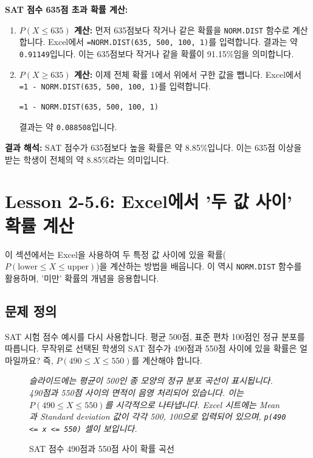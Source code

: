 \documentclass[11pt,a4paper]{article}
\begin{document}
\begin{examplebox}
    \textbf{SAT 점수 635점 초과 확률 계산:}
    \begin{enumerate}
        \item \textbf{$P(X \le 635)$ 계산:}
        먼저 635점보다 작거나 같은 확률을 \texttt{NORM.DIST} 함수로 계산합니다.
        Excel에서 \texttt{=NORM.DIST(635, 500, 100, 1)}를 입력합니다.
        결과는 약 \texttt{0.91149}입니다.
        이는 635점보다 작거나 같을 확률이 91.15\%임을 의미합니다.

        \item \textbf{$P(X \ge 635)$ 계산:}
        이제 전체 확률 1에서 위에서 구한 값을 뺍니다.
        Excel에서 \texttt{=1 - NORM.DIST(635, 500, 100, 1)}를 입력합니다.
        \begin{lstlisting}[language=Excel, caption={Excel에서 '초과' 확률 계산 예시}, label={lst:norm_dist_greater_than}]
=1 - NORM.DIST(635, 500, 100, 1)
        \end{lstlisting}
        결과는 약 \texttt{0.088508}입니다.
    \end{enumerate}

    \textbf{결과 해석:}
    SAT 점수가 635점보다 높을 확률은 약 8.85\%입니다.
    이는 635점 이상을 받는 학생이 전체의 약 8.85\%라는 의미입니다.
\end{examplebox}

\newpage
\section{Lesson 2-5.6: Excel에서 '두 값 사이' 확률 계산}

이 섹션에서는 Excel을 사용하여 두 특정 값 사이에 있을 확률($P(\text{lower} \le X \le \text{upper})$)을 계산하는 방법을 배웁니다.
이 역시 \texttt{NORM.DIST} 함수를 활용하며, '미만' 확률의 개념을 응용합니다.

\subsection{문제 정의}
SAT 시험 점수 예시를 다시 사용합니다. 평균 500점, 표준 편차 100점인 정규 분포를 따릅니다.
무작위로 선택된 학생의 SAT 점수가 490점과 550점 사이에 있을 확률은 얼마일까요?
즉, $P(490 \le X \le 550)$를 계산해야 합니다.

\begin{figure}[h!]
    \centering
    \caption{SAT 점수 490점과 550점 사이 확률 곡선}
    \label{fig:sat_between_values}
    \vspace{0.5em}
    \textit{슬라이드에는 평균이 500인 종 모양의 정규 분포 곡선이 표시됩니다. 490점과 550점 사이의 면적이 음영 처리되어 있습니다. 이는 $P(490 \le X \le 550)$를 시각적으로 나타냅니다. Excel 시트에는 Mean과 Standard deviation 값이 각각 500, 100으로 입력되어 있으며, \texttt{p(490 <= x <= 550)} 셀이 보입니다.}
\end{figure}
\end{document}

